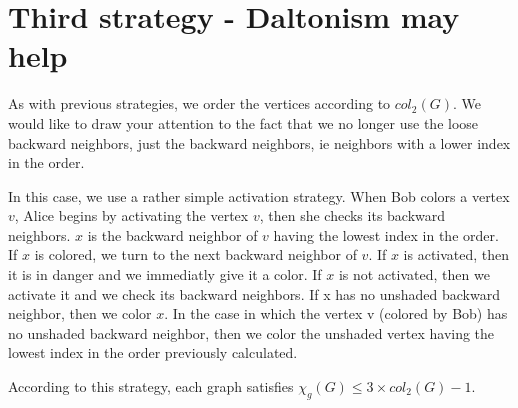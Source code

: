 \section{Third strategy - Daltonism may help}

As with previous strategies, we order the vertices according to $col_{2}(G)$.
We would like to draw your attention to the fact that we no longer use the loose backward neighbors, just the backward neighbors, ie neighbors with a lower index in the order.

In this case, we use a rather simple activation strategy.
When Bob colors a vertex $v$, Alice begins by activating the vertex $v$, then she checks its backward neighbors.
$x$ is the backward neighbor of $v$ having the lowest index in the order.
If $x$ is colored, we turn to the next backward neighbor of $v$. If $x$ is activated, then it is in danger and we immediatly give it a color. If $x$ is not activated, then we activate it and we check its backward neighbors. If x has no unshaded backward neighbor, then we color $x$.
In the case in which the vertex v (colored by Bob) has no unshaded backward neighbor, then we color the unshaded vertex having the lowest index in the order previously calculated.


According to this strategy, each graph satisfies $\chi_{g}(G) \leq 3 \times col_{2}(G) - 1$.